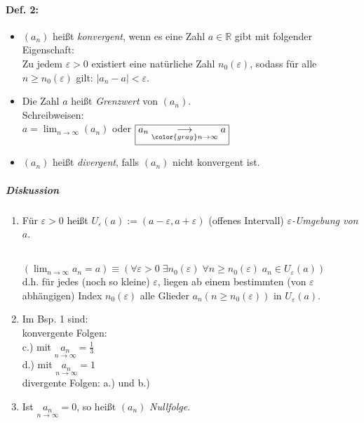 \paragraph{Def. 2:} 
\begin{itemize}
\item $(a_n)$ heißt \emph{konvergent}, wenn es eine Zahl $a \in \mathbb{R}$ gibt mit folgender Eigenschaft:\\
Zu jedem $\varepsilon > 0$ existiert eine natürliche Zahl $n_0(\varepsilon)$, sodass für alle $n \geq n_0(\varepsilon)$ gilt: $|a_n-a|< \varepsilon$.
\item Die Zahl $a$ heißt \emph{Grenzwert} von $(a_n)$.\\
Schreibweisen:\\
$\boxed{a=\lim_{n\rightarrow \infty}(a_n)}$ oder $\boxed{a_n \underset{\color{gray}n\rightarrow\infty}{\longrightarrow} a}$
\item $(a_n)$ heißt \emph{divergent}, falls $(a_n)$ nicht konvergent ist.
\end{itemize}
\subparagraph{Diskussion}
\begin{enumerate}
\item Für $\varepsilon>0$ heißt $U_{\varepsilon}(a):=(a-\varepsilon, a+\varepsilon)$ (offenes Intervall) \emph{$\varepsilon$-Umgebung von $a$}.\\
\\
$\left( \lim_{n\rightarrow \infty}a_n=a\right)\equiv \left( \forall\varepsilon>0 \; \exists n_0(\varepsilon) \; \forall n\geq n_0(\varepsilon) \; a_n \in U_{\varepsilon}(a)\right)$\\
d.h. für jedes (noch so kleine) $\varepsilon$, liegen ab einem bestimmten (von $\varepsilon$ abhängigen) Index $n_0(\varepsilon)$ alle Glieder $a_n(n\geq n_0(\varepsilon))$ in $U_{\varepsilon}(a)$.
\item Im Bsp. 1 sind:\\
konvergente Folgen: \\
c.) mit $\underset{n\rightarrow\infty}{a_n}=\frac{1}{3}$\\
d.) mit $\underset{n\rightarrow\infty}{a_n}=1$\\
divergente Folgen: a.) und b.)
\item Ist $\underset{n\rightarrow\infty}{a_n}=0$, so heißt $(a_n)$ \emph{Nullfolge}.
\end{enumerate}

